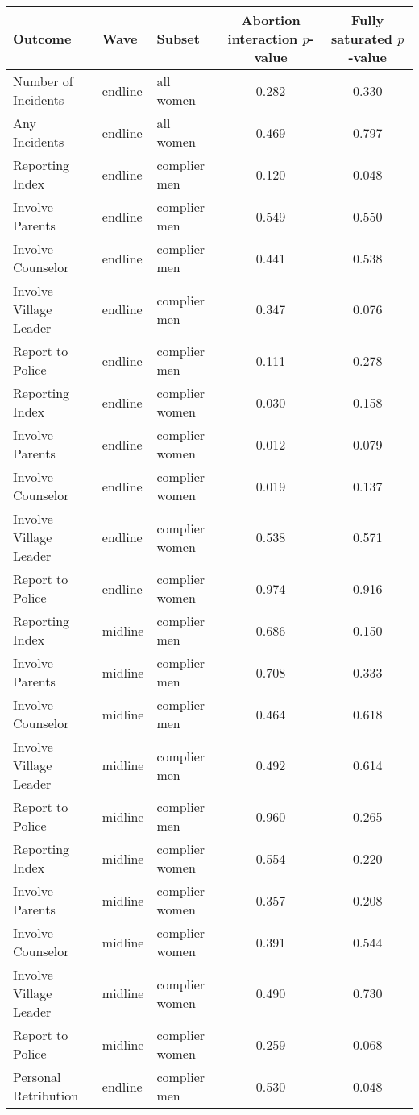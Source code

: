 
\begin{tabular}{l|l|l|c|c}
\hline
Outcome & Wave & Subset & Abortion interaction $p$-value & Fully saturated $p$-value\\
\hline
Number of Incidents & endline & all women & 0.282 & 0.330\\
\hline
Any Incidents & endline & all women & 0.469 & 0.797\\
\hline
Reporting Index & endline & complier men & 0.120 & 0.048\\
\hline
Involve Parents & endline & complier men & 0.549 & 0.550\\
\hline
Involve Counselor & endline & complier men & 0.441 & 0.538\\
\hline
Involve Village Leader & endline & complier men & 0.347 & 0.076\\
\hline
Report to Police & endline & complier men & 0.111 & 0.278\\
\hline
Reporting Index & endline & complier women & 0.030 & 0.158\\
\hline
Involve Parents & endline & complier women & 0.012 & 0.079\\
\hline
Involve Counselor & endline & complier women & 0.019 & 0.137\\
\hline
Involve Village Leader & endline & complier women & 0.538 & 0.571\\
\hline
Report to Police & endline & complier women & 0.974 & 0.916\\
\hline
Reporting Index & midline & complier men & 0.686 & 0.150\\
\hline
Involve Parents & midline & complier men & 0.708 & 0.333\\
\hline
Involve Counselor & midline & complier men & 0.464 & 0.618\\
\hline
Involve Village Leader & midline & complier men & 0.492 & 0.614\\
\hline
Report to Police & midline & complier men & 0.960 & 0.265\\
\hline
Reporting Index & midline & complier women & 0.554 & 0.220\\
\hline
Involve Parents & midline & complier women & 0.357 & 0.208\\
\hline
Involve Counselor & midline & complier women & 0.391 & 0.544\\
\hline
Involve Village Leader & midline & complier women & 0.490 & 0.730\\
\hline
Report to Police & midline & complier women & 0.259 & 0.068\\
\hline
Personal Retribution & endline & complier men & 0.530 & 0.048\\

\end{tabular}
